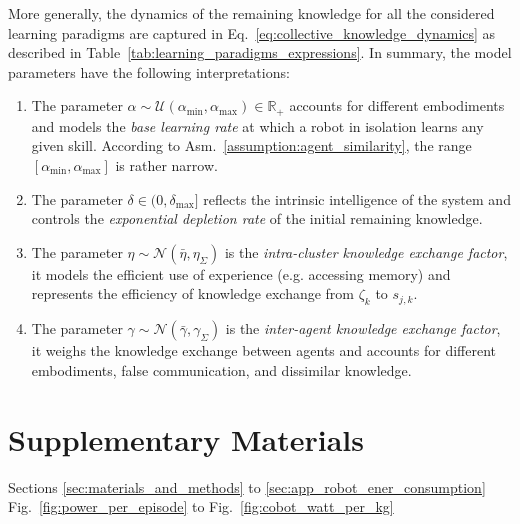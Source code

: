 \documentclass[12pt]{article}
\renewcommand{\emph}[1]{\textit{#1}}
\begin{document}
More generally, the dynamics of the remaining knowledge for all the considered learning paradigms are captured in Eq.~\eqref{eq:collective_knowledge_dynamics} as described in Table~\ref{tab:learning_paradigms_expressions}. In summary, the model parameters have the following interpretations:
\begin{enumerate}
	\item The parameter $\alpha \sim \mathcal{U}(\alpha_{\text{min}},\alpha_{\text{max}}) \in \mathbb{R}_+$ accounts for different embodiments and models the \emph{base learning rate} at which a robot in isolation learns any given skill. According to Asm.~\ref{assumption:agent_similarity}, the range $[\alpha_{\text{min}},\alpha_{\text{max}}]$ is rather narrow.
	\item The parameter $\delta \in (0,\delta_{\text{max}}]$ reflects the intrinsic intelligence of the system and controls the \emph{exponential depletion rate}  of the initial remaining knowledge.
	\item The parameter $\eta \sim \mathcal{N}(\bar{\eta},\eta_{\Sigma})$ is the \emph{intra-cluster knowledge exchange factor}, it models the efficient use of experience (e.g. accessing memory) and represents the efficiency of knowledge exchange from $\zeta_k$ to $s_{j,k}$.
	\item The parameter $\gamma \sim \mathcal{N}(\bar{\gamma},\gamma_\Sigma)$ is the \emph{inter-agent knowledge exchange factor}, it weighs the knowledge exchange between agents and accounts for different embodiments, false communication, and dissimilar knowledge.
\end{enumerate}

\section*{Supplementary Materials}
Sections \ref{sec:materials_and_methods} to \ref{sec:app_robot_ener_consumption}\\
Fig.~\ref{fig:power_per_episode} to Fig.~\ref{fig:cobot_watt_per_kg}
\end{document}
